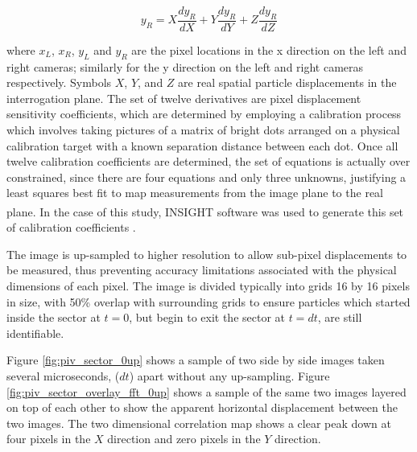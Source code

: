 \begin{equation}
y_R= X\frac{dy_R}{dX} + Y\frac{dy_R}{dY} + Z\frac{dy_R}{dZ}
\label{eq:piv_to_real4}
\end{equation}

\noindent
where $x_L$, $x_R$, $y_L$ and $y_R$ are the pixel locations in the x 
direction on the left and right cameras; similarly for the y direction on the 
left and 
right cameras respectively. Symbols $X$, $Y$, and $Z$ are real spatial particle 
displacements in the interrogation plane. The set of twelve derivatives are 
pixel displacement sensitivity coefficients, which are determined by employing 
a calibration process which involves taking pictures of a matrix of bright 
dots arranged on a physical calibration target with a known separation distance 
between 
each dot. Once all twelve calibration coefficients are determined, the set of 
equations is actually over constrained, since there are four equations and only 
three unknowns, justifying a least squares best fit to map measurements from 
the image plane to the real plane. In the case of this study, 
INSIGHT\textsuperscript{\textcopyright}  software was used to generate this 
set of calibration 
coefficients 
\cite{fouras2007}.

The image is 
up-sampled to higher resolution to allow sub-pixel displacements to be 
measured, thus preventing accuracy limitations associated with the physical 
dimensions of each pixel. The image is divided typically into grids 16 by 16 
pixels in size, with 50\% overlap with surrounding grids to ensure particles 
which started inside the sector at $t=0$, but begin to exit the sector at 
$t=dt$, are still identifiable.  


Figure \ref{fig:piv_sector_0up} shows a sample of two side by side images taken 
several microseconds, ($dt$) apart without any up-sampling. Figure 
\ref{fig:piv_sector_overlay_fft_0up} shows a sample of the same two images 
layered on top of each other to show the apparent horizontal displacement 
between the two images. The two dimensional correlation map shows a clear peak 
down at four pixels in the $X$ direction and zero pixels in the $Y$ direction.


